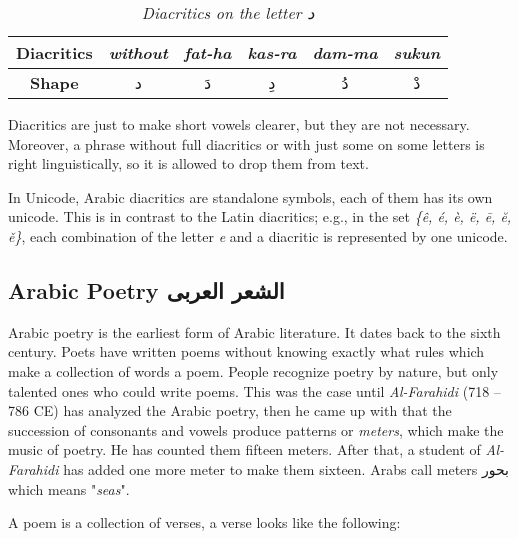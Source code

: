 \documentclass[12pt]{report}
\begin{document}
\begin{table}[!t]
  \centering
  \begin{tabular}{c c c c c c} 
    \toprule
    \textbf{\small{Diacritics}}     & \small{\textit{without}} & \small{\textit{fat-ha}} &
            \small{\textit{kas-ra}} & \small{\textit{dam-ma}} & \small{\textit{sukun}}\\
    \midrule
    \textbf{\small{Shape}}   & \textarabic{د} & \textarabic{دَ} & \textarabic{دِ} &
            \textarabic{دُ} & \textarabic{دْ}\\
    \bottomrule
  \end{tabular}
  \caption{\textit{Diacritics on the letter \textarabic{د}}}\label{arabic:diacritics_dal}
\end{table}

Diacritics are just to make short vowels clearer, but they are not necessary.
Moreover, a phrase without full diacritics or with just some on some letters is
right linguistically, so it is allowed to drop them from text.

In Unicode, Arabic diacritics are standalone symbols, each of them has its own
unicode. This is in contrast to the Latin diacritics; e.g., in the set
\textit{\{ê, é, è, ë, ē, ĕ, ě\}}, each combination of the letter \textit{e} and a diacritic is represented by one unicode.


\subsection{Arabic Poetry \textarabic{الشعر العربى}}
Arabic poetry is the earliest form of Arabic literature. It dates back to the sixth century. Poets have written poems without knowing exactly what rules which make a collection of words a poem. People recognize poetry by nature, but only talented ones who could write poems. %
This was the case until \textit{Al-Farahidi} (718 – 786 CE) has analyzed the
Arabic poetry, then he came up with that the succession of consonants and vowels
produce patterns or \textit{meters}, which make the music of poetry.  He has
counted them fifteen meters.  After that, a student of \textit{Al-Farahidi} has
added one more meter to make them sixteen. Arabs call meters \textarabic{بحور}
which means "\textit{seas}".

\bigskip

A poem is a collection of verses, a verse looks like the following:%
\end{document}
